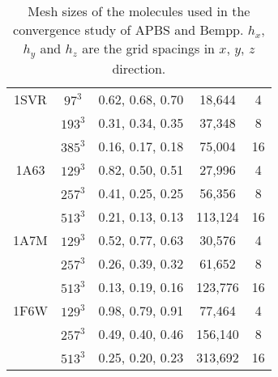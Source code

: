 \documentclass[11pt]{article}
\begin{document}
\begin{table}[]
\begin{tabular}{c|cc|cc}
  1SVR & $97^3$     & 0.62, 0.68, 0.70                 & 18,644     & 4                              \\
       & $193^3$    & 0.31, 0.34, 0.35                 & 37,348     & 8                              \\
       & $385^3$    & 0.16, 0.17, 0.18                 & 75,004     & 16                             \\ \hline
  1A63 & $129^3$    & 0.82, 0.50, 0.51                 & 27,996     & 4                              \\
       & $257^3$    & 0.41, 0.25, 0.25                 & 56,356     & 8                              \\
       & $513^3$    & 0.21, 0.13, 0.13                 & 113,124    & 16                             \\ \hline
  1A7M & $129^3$    & 0.52, 0.77, 0.63                 & 30,576     & 4                              \\
       & $257^3$    & 0.26, 0.39, 0.32                 & 61,652     & 8                              \\
       & $513^3$    & 0.13, 0.19, 0.16                 & 123,776    & 16                             \\ \hline
  1F6W & $129^3$    & 0.98, 0.79, 0.91                 & 77,464     & 4                              \\
       & $257^3$    & 0.49, 0.40, 0.46                 & 156,140    & 8                              \\
       & $513^3$    & 0.25, 0.20, 0.23                 & 313,692    & 16                            
  \end{tabular}
  \caption{Mesh sizes of the molecules used in the convergence study of APBS and Bempp.
  $h_x$, $h_y$ and $h_z$ are the grid spacings in $x$, $y$, $z$ direction.}
  \label{tab:APBS_mesh}
\end{table}
\end{document}
